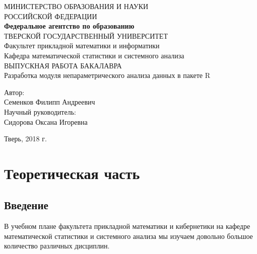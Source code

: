 \documentclass[14pt,a4paper]{scrartcl}
\begin{document}
    \begin{titlepage}
        \begin{center}
            \large
            МИНИСТЕРСТВО ОБРАЗОВАНИЯ И НАУКИ\\
            РОССИЙСКОЙ ФЕДЕРАЦИИ\\
            \textbf{Федеральное агентство по образованию\\}
            \vspace{0.5cm}
            ТВЕРСКОЙ ГОСУДАРСТВЕННЫЙ УНИВЕРСИТЕТ\\
            \vspace{0.25cm}
            Факультет прикладной математики и информатики\\
            Кафедра математической статистики и системного анализа\\
            \vfill
            \textsc{ВЫПУСКНАЯ РАБОТА БАКАЛАВРА}\\[5mm]
            {\LARGE Разработка модуля непараметрического анализа данных в пакете R\\[2mm]}
            \bigskip
        \end{center}
        \vfill
        \hfill
        \begin{minipage}{0.4\textwidth}
            Автор:\\
            Семенков Филипп Андреевич\\
            \newline
            Научный руководитель:\\
            Сидорова Оксана Игоревна\\
        \end{minipage}
        \vfill
        \begin{center}
            Тверь, 2018 г.
        \end{center}
    \end{titlepage}

    \newpage
    \tableofcontents

    \newpage
    \section[Теоретическая часть]{Теоретическая часть}
    \subsection[Введение]{Введение}
    В учебном плане факультета прикладной математики и кибернетики на кафедре математической статистики и системного
    анализа мы изучаем довольно большое количество различных дисциплин.
\end{document}
